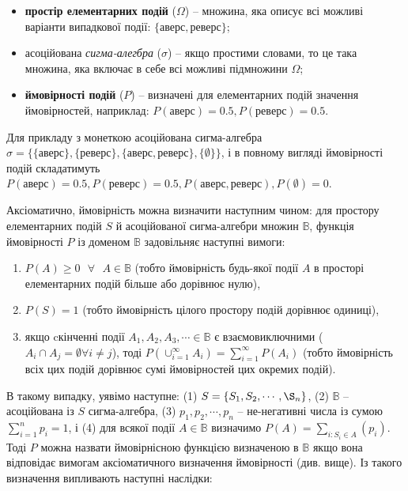 \documentclass[
  11pt,
]{book}
\begin{document}
\begin{itemize}
\item
  \textbf{простір елементарних подій} (\(\Omega\)) -- множина, яка описує всі можливі варіанти випадкової події: \(\{аверс, реверс\}\);
\item
  асоційована \emph{сигма-алегбра} (\(\sigma\)) -- якщо простими словами, то це така множина, яка включає в себе всі можливі підмножини \(\Omega\);
\item
  \textbf{ймовірності подій} (\(P\)) -- визначені для елементарних подій значення ймовірностей, наприклад: \(P(аверс) = 0.5, P(реверс) = 0.5\).
\end{itemize}

Для прикладу з монеткою асоційована сигма-алгебра \(\sigma = \{\{аверс\}, \{реверс\}, \{аверс, реверс\}, \{\emptyset\}\}\), і в повному вигляді ймовірності подій складатимуть \(P(аверс) = 0.5, P(реверс) = 0.5, P({аверс, реверс}), P(\emptyset) = 0\).

Аксіоматично, ймовірність можна визначити наступним чином: для простору елементарних подій \(S\) й асоційованої сигма-алгебри множин \(\mathbb{B}\), функція ймовірності \(P\) із доменом \(\mathbb{B}\) задовільняє наступні вимоги:

\begin{enumerate}
\def\labelenumi{\arabic{enumi}.}
\item
  \(P(A) \geq 0 \text{ } \forall \text{ } A \in \mathbb{B}\) (тобто ймовірність будь-якої події \(A\) в просторі елементарних подій більше або дорівнює нулю),
\item
  \(P(S) = 1\) (тобто ймовірність цілого простору подій дорівнює одиниці),
\item
  якщо cкінченні події \(A_1, A_2, A_3, \cdots \in \mathbb{B}\) є взаємовиключними (\(A_i \cap A_j = \emptyset \forall i \neq j\)), тоді \(P(\cup_{i=1}^{\infty} A_i) = \sum_{i=1}^{\infty} P(A_i)\) (тобто ймовірність всіх цих подій дорівнює сумі ймовірностей цих окремих подій).
\end{enumerate}

В такому випадку, уявімо наступне: (1) \(S = \{S_1, S_2, \cdots, \S_n\}\), (2) \(\mathbb{B}\) -- асоційована із \(S\) сигма-алгебра, (3) \(p_1, p_2, \cdots, p_n\) -- не-негативні числа із сумою \(\sum_{i=1}^n p_i = 1\), і (4) для всякої події \(A \in \mathbb{B}\) визначимо \(P(A) = \sum_{i:S_i \in A}(p_i)\). Тоді \(P\) можна назвати ймовірнісною функцією визначеною в \(\mathbb{B}\) якщо вона відповідає вимогам аксіоматичного визначення ймовірності (див. вище). Із такого визначення випливають наступні наслідки:
\end{document}
